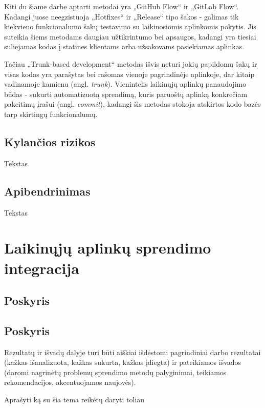 \documentclass{VUMIFPSkursinis}
\begin{document}
Kiti du šiame darbe aptarti metodai yra „GitHub Flow“ ir „GitLab Flow“. Kadangi juose neegzistuoja „Hotfixes“ ir „Release“ tipo šakos - galimas tik kiekvieno funkcionalumo šakų testavimo su laikinosiomis aplinkomis pokytis. Jis suteikia šiems metodams daugiau užtikrintumo bei apsaugos, kadangi yra tiesiai suliejamas kodas į statines klientams arba užsakovams pasiekiamas aplinkas.

Tačiau „Trunk-based development“ metodas išvis neturi jokių papildomų šakų ir visas kodas yra parašytas bei rašomas vienoje pagrindinėje aplinkoje, dar kitaip vadinamoje kamienu (angl. \textit{trunk}). Vienintelis laikinųjų aplinkų panaudojimo būdas - sukurti automatizuotą sprendimą, kuris paruoštų aplinką konkrečiam pakeitimų įrašui (angl. \textit{commit}), kadangi šis metodas stokoja atskirtos kodo bazės tarp skirtingų funkcionalumų.


\subsection{Kylančios rizikos}

Tekstas

\subsection{Apibendrinimas}

Tekstas


\section{Laikinųjų aplinkų sprendimo integracija}
\subsection{Poskyris}
\subsection{Poskyris}

Rezultatų ir išvadų dalyje turi būti aiškiai išdėstomi pagrindiniai darbo
rezultatai (kažkas išanalizuota, kažkas sukurta, kažkas įdiegta) ir pateikiamos
išvados (daromi nagrinėtų problemų sprendimo metodų palyginimai, teikiamos
rekomendacijos, akcentuojamos naujovės).

Aprašyti ką su šia tema reikėtų daryti toliau
\end{document}
